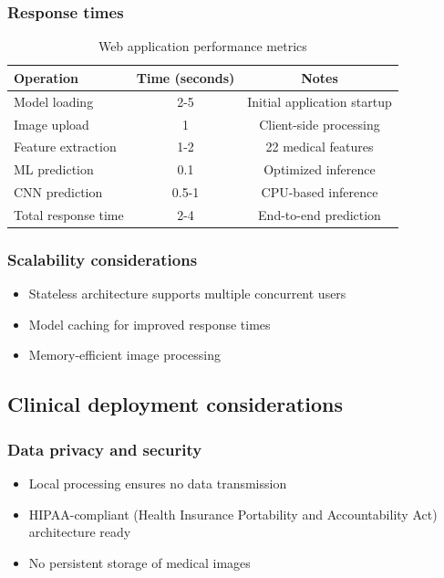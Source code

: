 \documentclass[11pt]{article}
\begin{document}
\subsubsection{Response times}
\begin{table}[H]
\centering
\caption{Web application performance metrics}
\begin{tabular}{lcc}
\toprule
\textbf{Operation} & \textbf{Time (seconds)} & \textbf{Notes} \\
\midrule
Model loading & 2-5 & Initial application startup \\
Image upload & 1 & Client-side processing \\
Feature extraction & 1-2 & 22 medical features \\
ML prediction & 0.1 & Optimized inference \\
CNN prediction & 0.5-1 & CPU-based inference \\
Total response time & 2-4 & End-to-end prediction \\
\bottomrule
\end{tabular}
\end{table}

\subsubsection{Scalability considerations}
\begin{itemize}
    \item Stateless architecture supports multiple concurrent users
    \item Model caching for improved response times
    \item Memory-efficient image processing
\end{itemize}

\subsection{Clinical deployment considerations}

\subsubsection{Data privacy and security}
\begin{itemize}
    \item Local processing ensures no data transmission
    \item HIPAA-compliant (Health Insurance Portability and Accountability Act) architecture ready
    \item No persistent storage of medical images
\end{itemize}
\end{document}
